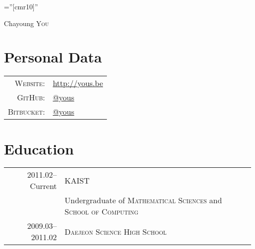 \documentclass[a4paper,10pt]{article}
\begin{document}

\pagestyle{empty} %

\font\fb=''[cmr10]'' %

\par{\centering
{\Huge Chayoung \textsc{You}
}\bigskip\par}

\section{Personal Data}

\begin{tabular}{rl}
  \textsc{Website:}   & \url{http://yous.be} \\
  \textsc{GitHub:}    & \href{https://github.com/yous}{@yous} \\
  \textsc{Bitbucket:} & \href{https://bitbucket.org/yous}{@yous}
\end{tabular}

\section{Education}
\begin{tabular}{rl}
  2011.02--Current & \textsc{KAIST} \\
  & Undergraduate of \textsc{Mathematical Sciences} and \textsc{School of Computing} \\
  2009.03--2011.02 & \textsc{Daejeon Science High School}
\end{tabular}

\end{document}
